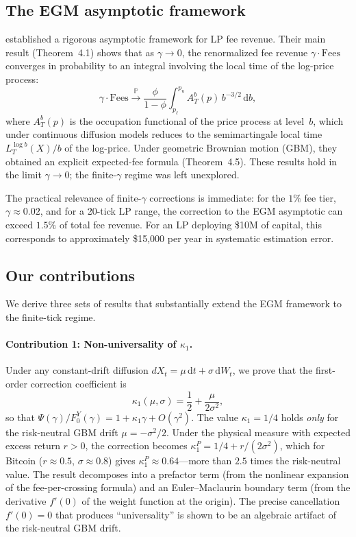 \documentclass[11pt]{article}
\theoremstyle{definition}
\theoremstyle{remark}
\newcommand{\PP}{\mathbb{P}}
\newcommand{\dd}{\,\mathrm{d}}
\newcommand{\Fees}{\mathrm{Fees}}
\begin{document}
\subsection{The EGM asymptotic framework}

\citet{EGM2025} established a rigorous asymptotic framework for LP fee
revenue. Their main result (Theorem~4.1) shows that as
$\gamma \to 0$, the renormalized fee revenue
$\gamma \cdot \Fees$ converges in probability to an integral
involving the local time of the log-price process:
\begin{equation}\label{eq:EGM_limit}
\gamma \cdot \Fees \xrightarrow{\PP} \frac{\phi}{1 - \phi}
\int_{p_\ell}^{p_u} A^b_T(p)\, b^{-3/2}\dd b,
\end{equation}
where $A^b_T(p)$ is the occupation functional of the price process at
level~$b$, which under continuous diffusion models reduces to the
semimartingale local time $L^{\log b}_T(X)/b$ of the log-price. Under
geometric Brownian motion (GBM), they obtained an explicit
expected-fee formula (Theorem~4.5). These results hold in the limit
$\gamma \to 0$; the finite-$\gamma$ regime was left unexplored.

The practical relevance of finite-$\gamma$ corrections is immediate:
for the $1\%$ fee tier, $\gamma \approx 0.02$, and for a 20-tick LP
range, the correction to the EGM asymptotic can exceed $1.5\%$ of
total fee revenue. For an LP deploying \$10M of capital, this
corresponds to approximately \$15{,}000 per year in systematic
estimation error.

\subsection{Our contributions}

We derive three sets of results that substantially extend the EGM
framework to the finite-tick regime.

\paragraph{Contribution 1: Non-universality of $\kappa_1$.}
Under any constant-drift diffusion
$dX_t = \mu\dd t + \sigma\dd W_t$, we prove that the first-order
correction coefficient is
\begin{equation}\label{eq:kappa1_intro}
\kappa_1(\mu, \sigma) = \frac{1}{2} + \frac{\mu}{2\sigma^2},
\end{equation}
so that $\Psi(\gamma)/F_0^Y(\gamma) = 1 + \kappa_1 \gamma +
O(\gamma^2)$. The value $\kappa_1 = 1/4$ holds \emph{only} for the
risk-neutral GBM drift $\mu = -\sigma^2/2$. Under the physical measure
with expected excess return $r > 0$, the correction becomes
$\kappa_1^P = 1/4 + r/(2\sigma^2)$, which for Bitcoin
($r \approx 0.5$, $\sigma \approx 0.8$) gives
$\kappa_1^P \approx 0.64$---more than $2.5$ times the risk-neutral
value. The result decomposes into a prefactor term (from the nonlinear
expansion of the fee-per-crossing formula) and an Euler--Maclaurin
boundary term (from the derivative $f'(0)$ of the weight function at
the origin). The precise cancellation $f'(0) = 0$ that produces
``universality'' is shown to be an algebraic artifact of the
risk-neutral GBM drift.
\end{document}
